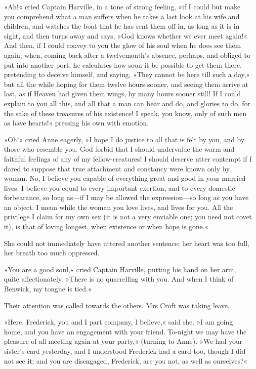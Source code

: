 »Ah!« cried Captain Harville, in a tone of strong feeling, »if I could but make you comprehend what a man suffers when he takes a last look at his wife and children, and watches the boat that he has sent them off in, as long as it is in sight, and then turns away and says, »God knows whether we ever meet again!« And then, if I could convey to you the glow of his soul when he does see them again; when, coming back after a twelvemonth's absence, perhaps, and obliged to put into another port, he calculates how soon it be possible to get them there, pretending to deceive himself, and saying, »They cannot be here till such a day,« but all the while hoping for them twelve hours sooner, and seeing them arrive at last, as if Heaven had given them wings, by many hours sooner still! If I could explain to you all this, and all that a man can bear and do, and glories to do, for the sake of these treasures of his existence! I speak, you know, only of such men as have hearts!« pressing his own with emotion.

»Oh!« cried Anne eagerly, »I hope I do justice to all that is felt by you, and by those who resemble you. God forbid that I should undervalue the warm and faithful feelings of any of my fellow-creatures! I should deserve utter contempt if I dared to suppose that true attachment and constancy were known only by woman. No, I believe you capable of everything great and good in your married lives. I believe you equal to every important exertion, and to every domestic forbearance, so long as—if I may be allowed the expression—so long as you have an object. I mean while the woman you love lives, and lives for you. All the privilege I claim for my own sex (it is not a very enviable one; you need not covet it), is that of loving longest, when existence or when hope is gone.«

She could not immediately have uttered another sentence; her heart was too full, her breath too much oppressed.

»You are a good soul,« cried Captain Harville, putting his hand on her arm, quite affectionately. »There is no quarrelling with you. And when I think of Benwick, my tongue is tied.«

Their attention was called towards the others. Mrs Croft was taking leave.

»Here, Frederick, you and I part company, I believe,« said she. »I am going home, and you have an engagement with your friend. To-night we may have the pleasure of all meeting again at your party,« (turning to Anne). »We had your sister's card yesterday, and I understood Frederick had a card too, though I did not see it; and you are disengaged, Frederick, are you not, as well as ourselves?«

